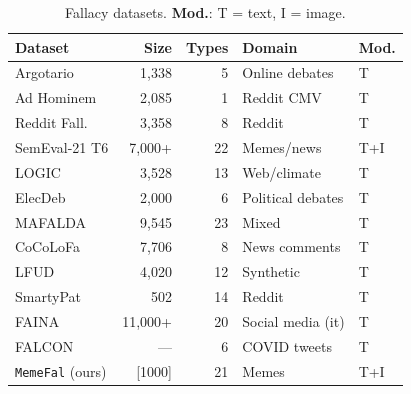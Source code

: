\documentclass[11pt]{article}
\newcommand{\corpus}{{\tt MemeFal}}
\begin{document}
\begin{table}[t]
\centering
\footnotesize
\setlength{\tabcolsep}{4pt}
\begin{tabular}{lrrll}
\toprule
\textbf{Dataset} & \textbf{Size} & \textbf{Types} & \textbf{Domain} & \textbf{Mod.} \\
\midrule
Argotario \citeyearpar{habernal_argotario_2017}        & 1,338  &  5 & Online debates    & T \\
Ad Hominem \citeyearpar{habernal_before_2018}          & 2,085  &  1 & Reddit CMV        & T \\
Reddit Fall. \citeyearpar{sahai_breaking_2021}         & 3,358  &  8 & Reddit            & T \\
SemEval-21 T6 \citeyearpar{dimitrov_semeval-2021_2021} & 7,000+ & 22 & Memes/news        & T+I \\
LOGIC \citeyearpar{jin_logical_2022}                   & 3,528  & 13 & Web/climate       & T \\
ElecDeb \citeyearpar{goffredo_argument-based_2023}     & 2,000  &  6 & Political debates & T \\
MAFALDA \citeyearpar{helwe_mafalda_2024}               & 9,545  & 23 & Mixed             & T \\
CoCoLoFa \citeyearpar{yeh_cocolofa_2024}               & 7,706  &  8 & News comments     & T \\
LFUD \citeyearpar{li_reason_2024}                      & 4,020  & 12 & Synthetic         & T \\
SmartyPat \citeyearpar{xu_socrates_2026}               &   502  & 14 & Reddit            & T \\
FAINA \citeyearpar{ramponi_fine-grained_2025}          & 11,000+& 20 & Social media (it) & T \\
FALCON \citeyearpar{chaves_falcon_2025}                & —      &  6 & COVID tweets      & T \\
\midrule
\corpus{} (ours)                                       & [1000] & 21 & Memes             & T+I \\
\bottomrule
\end{tabular}
\caption{Fallacy datasets. \textbf{Mod.}: T = text, I = image.}
\label{tab:datasets}
\end{table}

\end{document}
